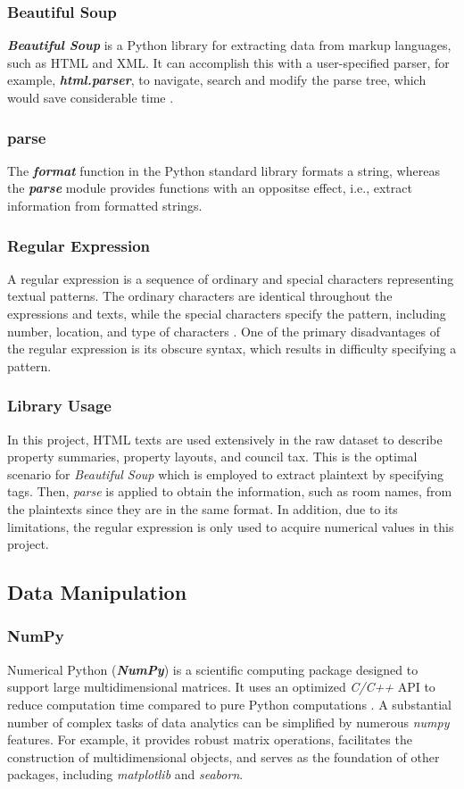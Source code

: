 \documentclass[12pt,twoside]{report}
\begin{document}
\subsubsection{Beautiful Soup}
\textit{\textbf{Beautiful Soup}} is a Python library for extracting data from markup languages, such as HTML and XML. It can accomplish this with a user-specified parser, for example, \textbf{\textit{html.parser}}, to navigate, search and modify the parse tree, which would save considerable time \citep{RN10}. 

\subsubsection{parse}
The \textit{\textbf{format}} function in the Python standard library formats a string, whereas the \textit{\textbf{parse}} module provides functions with an oppositse effect, i.e., extract information from formatted strings.

\subsubsection{Regular Expression}
A regular expression is a sequence of ordinary and special characters representing textual patterns. The ordinary characters are identical throughout the expressions and texts, while the special characters specify the pattern, including number, location, and type of characters  \citep{RN14}. One of the primary disadvantages of the regular expression is its obscure syntax, which results in difficulty specifying a pattern. 

\subsubsection{Library Usage}
In this project, HTML texts are used extensively in the raw dataset to describe property summaries, property layouts, and council tax. This is the optimal scenario for \textit{Beautiful Soup} which is employed to extract plaintext by specifying tags. Then, \textit{parse} is applied to obtain the information, such as room names, from the plaintexts since they are in the same format. In addition, due to its limitations, the regular expression is only used to acquire numerical values in this project. 


\subsection{Data Manipulation}
\subsubsection{NumPy}
Numerical Python (\textit{\textbf{NumPy}}) is a scientific computing package designed to support large multidimensional matrices. It uses an optimized \textit{C/C++} API to reduce computation time compared to pure Python computations \citep{RN6}. A substantial number of complex tasks of data analytics can be simplified by numerous \textit{numpy} features. For example, it provides robust matrix operations, facilitates the construction of multidimensional objects, and serves as the foundation of other packages, including \textit{matplotlib} and \textit{seaborn}.
\end{document}
